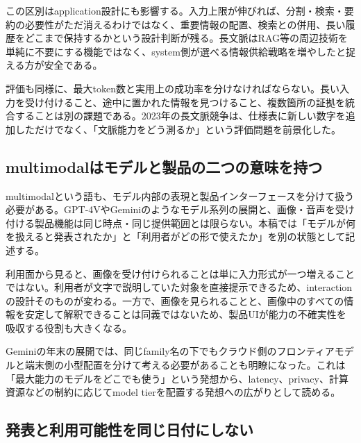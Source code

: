 この区別はapplication設計にも影響する。入力上限が伸びれば、分割・検索・要約の必要性がただ消えるわけではなく、重要情報の配置、検索との併用、長い履歴をどこまで保持するかという設計判断が残る。長文脈はRAG等の周辺技術を単純に不要にする機能ではなく、system側が選べる情報供給戦略を増やしたと捉える方が安全である。\autocite{src-013fa77665db,src-2b6af707f3ef,src-39071a9443e5,src-b1525886b462,src-f5041642fb21}


評価も同様に、最大token数と実用上の成功率を分けなければならない。長い入力を受け付けること、途中に置かれた情報を見つけること、複数箇所の証拠を統合することは別の課題である。2023年の長文脈競争は、仕様表に新しい数字を追加しただけでなく、「文脈能力をどう測るか」という評価問題を前景化した。\autocite{src-013fa77665db,src-2b6af707f3ef,src-39071a9443e5,src-b1525886b462,src-f5041642fb21}


\subsection{multimodalはモデルと製品の二つの意味を持つ}

multimodalという語も、モデル内部の表現と製品インターフェースを分けて扱う必要がある。GPT-4VやGeminiのようなモデル系列の展開と、画像・音声を受け付ける製品機能は同じ時点・同じ提供範囲とは限らない。本稿では「モデルが何を扱えると発表されたか」と「利用者がどの形で使えたか」を別の状態として記述する。\autocite{src-3375c5d27d9b,src-5bfa9c93d034,src-93d355bf8806,src-a3dead6cff65,src-a95452783369,src-db671ee1d1b8,src-f951bda6a0f4,src-fd9cb9c0061f}


利用面から見ると、画像を受け付けられることは単に入力形式が一つ増えることではない。利用者が文字で説明していた対象を直接提示できるため、interactionの設計そのものが変わる。一方で、画像を見られることと、画像中のすべての情報を安定して解釈できることは同義ではないため、製品UIが能力の不確実性を吸収する役割も大きくなる。\autocite{src-3375c5d27d9b,src-5bfa9c93d034,src-93d355bf8806,src-a3dead6cff65,src-a95452783369,src-db671ee1d1b8,src-f951bda6a0f4,src-fd9cb9c0061f}


Geminiの年末の展開では、同じfamily名の下でもクラウド側のフロンティアモデルと端末側の小型配置を分けて考える必要があることも明瞭になった。これは「最大能力のモデルをどこでも使う」という発想から、latency、privacy、計算資源などの制約に応じてmodel tierを配置する発想への広がりとして読める。\autocite{src-93d355bf8806,src-a3dead6cff65,src-db671ee1d1b8,src-e116708067ab,src-fd9cb9c0061f}


\subsection{発表と利用可能性を同じ日付にしない}

